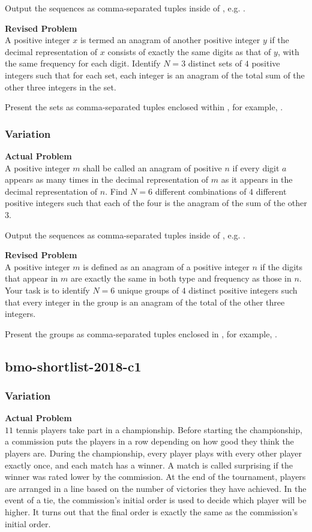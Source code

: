 Output the sequences as comma-separated tuples inside of \boxed, e.g. .

\textbf{Revised Problem}\\
A positive integer $x$ is termed an anagram of another positive integer $y$ if the decimal representation of $x$ consists of exactly the same digits as that of $y$, with the same frequency for each digit. Identify $N=3$ distinct sets of $4$ positive integers such that for each set, each integer is an anagram of the total sum of the other three integers in the set.

Present the sets as comma-separated tuples enclosed within \boxed, for example, .

\subsubsection{Variation}
\textbf{Actual Problem}\\
A positive integer $m$ shall be called an anagram of positive $n$ if every digit $a$ appears as many times in the decimal representation of $m$ as it appears in the decimal representation of $n$. Find $N=6$ different combinations of $4$ different positive integers such that each of the four is the anagram of the sum of the other $3$.

Output the sequences as comma-separated tuples inside of \boxed, e.g. .

\textbf{Revised Problem}\\
A positive integer $m$ is defined as an anagram of a positive integer $n$ if the digits that appear in $m$ are exactly the same in both type and frequency as those in $n$. Your task is to identify $N=6$ unique groups of $4$ distinct positive integers such that every integer in the group is an anagram of the total of the other three integers.

Present the groups as comma-separated tuples enclosed in \boxed, for example, .

\subsection{bmo-shortlist-2018-c1}
\subsubsection{Variation}
\textbf{Actual Problem}\\
$11$ tennis players take part in a championship. Before starting the championship, a commission puts the players in a row depending on how good they think the players are. During the championship, every player plays with every other player exactly once, and each match has a winner. A match is called surprising if the winner was rated lower by the commission. At the end of the tournament, players are arranged in a line based on the number of victories they have achieved. In the event of a tie, the commission's initial order is used to decide which player will be higher.
It turns out that the final order is exactly the same as the commission's initial order. 

